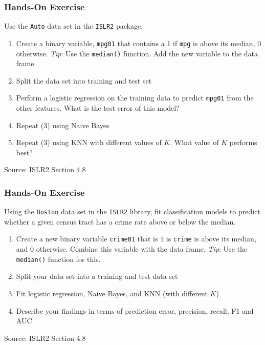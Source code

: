 \begin{tcolorbox}[colback=code]
\subsubsection*{Hands-On Exercise} 
Use the \texttt{Auto} data set in the \texttt{ISLR2} package.
\begin{enumerate}
   \item Create a binary variable, \texttt{mpg01} that contains a 1 if \texttt{mpg} is above its median, 0 otherwise. \emph{Tip}: Use the \texttt{median()} function. Add the new variable to the data frame.
   \item Split the data set into training and test set
   \item Perform a logistic regression on the training data to predict \texttt{mpg01} from the other features. What is the test error of this model?
   \item Repeat (3) using Naive Bayes
   \item Repeat (3) using KNN with different values of $K$. What value of $K$ performs best?
\end{enumerate}
{\footnotesize \vspace{\baselineskip} Source: ISLR2 Section 4.8}
\end{tcolorbox}

\begin{tcolorbox}[colback=code]
\subsubsection*{Hands-On Exercise} 
Using the \texttt{Boston} data set in the \texttt{ISLR2} library, fit classification models to predict whether a given census tract has a crime rate above or below the median.
\begin{enumerate}
   \item Create a new binary variable \texttt{crime01} that is $1$ is \texttt{crime} is above its median, and $0$ otherwise. Combine this variable with the data frame. \emph{Tip}: Use the \texttt{median()} function for this.
   \item Split your data set into a training and test data set
   \item Fit logistic regression, Naive Bayes, and KNN (with different $K$)
   \item Describe your findings in terms of prediction error, precision, recall, F1 and AUC
\end{enumerate}
{\footnotesize \vspace{\baselineskip} Source: ISLR2 Section 4.8}
\end{tcolorbox}

